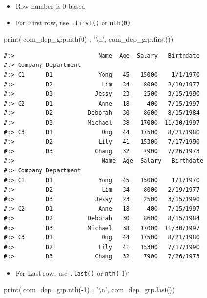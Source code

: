 \documentclass[
]{book}
\newenvironment{Shaded}{\begin{snugshade}}{\end{snugshade}}
\newcommand{\BuiltInTok}[1]{#1}
\newcommand{\CharTok}[1]{\textcolor[rgb]{0.5,0.5,0.5}{#1}}
\newcommand{\DecValTok}[1]{\textcolor[rgb]{0.06,0.06,0.06}{#1}}
\newcommand{\NormalTok}[1]{#1}
\newcommand{\OperatorTok}[1]{\textcolor[rgb]{0.43,0.43,0.43}{\textbf{#1}}}
\newcommand{\StringTok}[1]{\textcolor[rgb]{0.5,0.5,0.5}{#1}}
\providecommand{\tightlist}{%
  \setlength{\itemsep}{0pt}\setlength{\parskip}{0pt}}
\begin{document}
\begin{itemize}
\tightlist
\item
  Row number is 0-based\\
\item
  For First row, use \texttt{.first()} or \texttt{nth(0)}
\end{itemize}

\begin{Shaded}
\begin{Highlighting}[]
\BuiltInTok{print}\NormalTok{( com_dep_grp.nth(}\DecValTok{0}\NormalTok{)  , }\StringTok{'}\CharTok{\textbackslash{}n}\StringTok{'}\NormalTok{,}
\NormalTok{       com_dep_grp.first())}
\end{Highlighting}
\end{Shaded}

\begin{verbatim}
#:>                        Name  Age  Salary   Birthdate
#:> Company Department                                  
#:> C1      D1             Yong   45   15000    1/1/1970
#:>         D2              Lim   34    8000   2/19/1977
#:>         D3            Jessy   23    2500   3/15/1990
#:> C2      D1             Anne   18     400   7/15/1997
#:>         D2          Deborah   30    8600   8/15/1984
#:>         D3          Michael   38   17000  11/30/1997
#:> C3      D1              Ong   44   17500   8/21/1980
#:>         D2             Lily   41   15300   7/17/1990
#:>         D3            Chang   32    7900   7/26/1973 
#:>                         Name  Age  Salary   Birthdate
#:> Company Department                                  
#:> C1      D1             Yong   45   15000    1/1/1970
#:>         D2              Lim   34    8000   2/19/1977
#:>         D3            Jessy   23    2500   3/15/1990
#:> C2      D1             Anne   18     400   7/15/1997
#:>         D2          Deborah   30    8600   8/15/1984
#:>         D3          Michael   38   17000  11/30/1997
#:> C3      D1              Ong   44   17500   8/21/1980
#:>         D2             Lily   41   15300   7/17/1990
#:>         D3            Chang   32    7900   7/26/1973
\end{verbatim}

\begin{itemize}
\tightlist
\item
  For Last row, use \texttt{.last()} or \texttt{nth(}-1)`
\end{itemize}

\begin{Shaded}
\begin{Highlighting}[]
\BuiltInTok{print}\NormalTok{( com_dep_grp.nth(}\OperatorTok{-}\DecValTok{1}\NormalTok{)  , }\StringTok{'}\CharTok{\textbackslash{}n}\StringTok{'}\NormalTok{,}
\NormalTok{       com_dep_grp.last())}
\end{Highlighting}
\end{Shaded}
\end{document}
